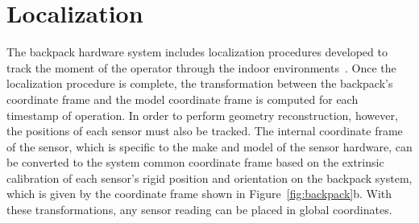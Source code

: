 \documentclass[12pt,onecolumn,oneside]{book}
\begin{document}

\section{Localization}
\label{sec:localization}


The backpack hardware system includes localization procedures developed to track the moment of the operator through the indoor environments~\cite{liu2010indoor,Backpack,Localization,NickJournal}.  Once the localization procedure is complete, the transformation between the backpack's coordinate frame and the model coordinate frame is computed for each timestamp of operation.  In order to perform geometry reconstruction, however, the positions of each sensor must also be tracked.  The internal coordinate frame of the sensor, which is specific to the make and model of the sensor hardware, can be converted to the system common coordinate frame based on the extrinsic calibration of each sensor's rigid position and orientation on the backpack system, which is given by the coordinate frame shown in Figure~\ref{fig:backpack}b. With these transformations, any sensor reading can be placed in global coordinates.
\end{document}
